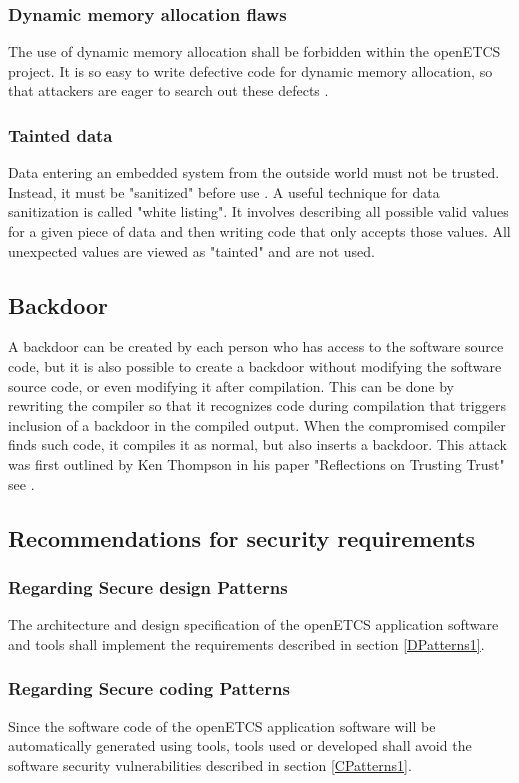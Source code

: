 \documentclass{template/openetcs_report}
\begin{document}
\subsubsection{Dynamic memory allocation flaws}
The use of dynamic memory allocation shall be forbidden within the openETCS project. It is so easy to write defective code for dynamic memory allocation, so that attackers are eager to search out these defects \cite{Kalinsky09}.
\subsubsection{Tainted data}
Data entering an embedded system from the outside world must not be trusted. Instead, it must be "sanitized" before use \cite{Kalinsky09}.
A useful technique for data sanitization is called "white listing". It involves describing all possible valid values for a given piece of data and then writing code that only accepts those values. All unexpected values are viewed as "tainted" and are not used.

\subsection{Backdoor}
\label{Backdoor1}
A backdoor can be created by each person who has access to the software source code, but it is also possible to create a backdoor without modifying the software source code, or even modifying it after compilation. This can be done by rewriting the compiler so that it recognizes code during compilation that triggers inclusion of a backdoor in the compiled output. When the compromised compiler finds such code, it compiles it as normal, but also inserts a backdoor. This attack was first outlined by Ken Thompson in his paper "Reflections on Trusting Trust" see \cite{Ken84}.



\subsection{Recommendations for security requirements}
\subsubsection{Regarding Secure design Patterns}
\label{DPatterns}
The architecture and design specification of the openETCS application software and tools shall implement the requirements described in section \ref{DPatterns1}.
\subsubsection{Regarding Secure coding Patterns}
\label{CPatterns}
Since the software code of the openETCS application software will be automatically generated using tools,  tools used or developed shall avoid the software security vulnerabilities described in section \ref{CPatterns1}.
\end{document}
